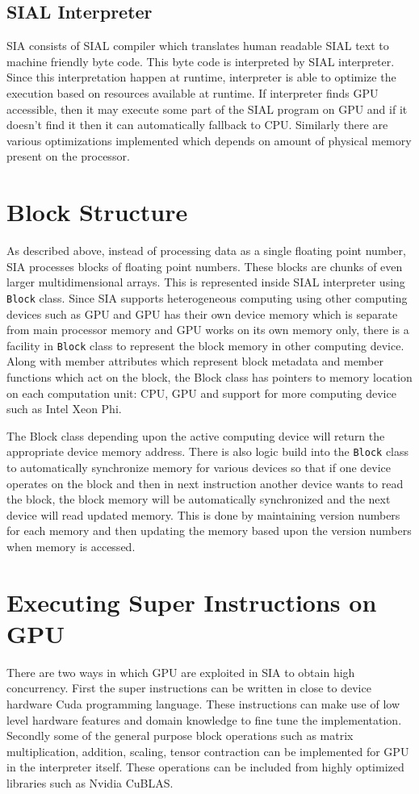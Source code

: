 \subsection{SIAL Interpreter}
SIA consists of SIAL compiler which translates human readable SIAL text to
machine friendly byte code. This byte code is interpreted by SIAL interpreter.
Since this interpretation happen at runtime, interpreter is able to optimize the
execution based on resources available at runtime. If interpreter finds GPU
accessible, then it may execute some part of the SIAL program on GPU and if it
doesn't find it then it can automatically fallback to CPU. Similarly there are
various optimizations implemented which depends on amount of physical memory
present on the processor.

\section{Block Structure}
As described above, instead of processing data as a single floating point
number, SIA processes blocks of floating point numbers. These blocks are chunks
of even larger multidimensional arrays. This is represented inside SIAL
interpreter using \texttt{Block} class. Since SIA supports heterogeneous computing
using other computing devices such as GPU and GPU has their own device memory
which is separate from main processor memory and GPU works on its own memory
only, there is a facility in \texttt{Block} class to represent the block memory in other
computing device. Along with member attributes which represent block metadata
and member functions which act on the block, the Block class has pointers to
memory location on each computation unit: CPU, GPU and support for more
computing device such as Intel Xeon Phi.

The Block class depending upon the active computing device will return the
appropriate device memory address. There is also logic build into the \texttt{Block}
class to automatically synchronize memory for various devices so that if one
device operates on the block and then in next instruction another device wants
to read the block, the block memory will be automatically synchronized and the
next device will read updated memory. This is done by maintaining version numbers
for each memory and then updating the memory based upon the version numbers when
memory is accessed.

\section{Executing Super Instructions on GPU}
There are two ways in which GPU are exploited in SIA to obtain high concurrency.
First the super instructions can be written in close to device hardware Cuda
programming language. These instructions can make use of low level hardware
features and domain knowledge to fine tune the implementation. Secondly some of
the general purpose block operations such as matrix multiplication, addition,
scaling, tensor contraction can be implemented for GPU in the interpreter
itself. These operations can be included from highly optimized libraries such as
Nvidia CuBLAS.

